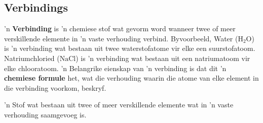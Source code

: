             \subsection*{Verbindings}
            \nopagebreak
        \label{m38708*id63363} 'n \textbf{Verbinding} is 'n chemiese stof wat gevorm word wanneer twee of meer verskillende elemente in 'n vaste verhouding verbind. Byvoorbeeld, Water ($\text{H}{}_{2}\text{O}$) is 'n verbinding wat bestaan uit twee waterstofatome vir elke een suurstofatoom. Natriumchloried ($\text{NaCl}$) is 'n verbinding wat bestaan uit een natriumatoom vir elke chlooratoom. 'n Belangrike eienskap van 'n verbinding is dat dit 'n \textbf{chemiese formule} het, wat die verhouding waarin die atome van elke element in die verbinding voorkom, beskryf.\par 
\label{m38708*fhsst!!!underscore!!!id201}
 { \label{m38708*meaningfhsst!!!underscore!!!id201}
        'n Stof wat bestaan uit twee of meer verskillende elemente wat in 'n vaste verhouding saamgevoeg is.
         } 



